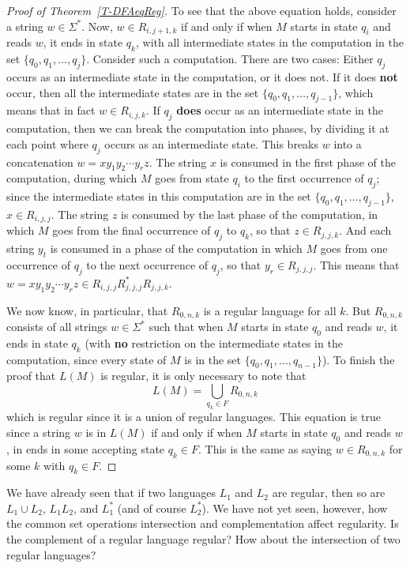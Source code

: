 \begin{proof}[Proof of Theorem~\ref{T-DFAeqReg}]
To see that the above equation holds, consider a string $w\in\Sigma^*$.
Now, $w\in R_{i,j+1,k}$ if and only if when $M$ starts in state $q_i$ and reads $w$,
it ends in state $q_k$, with all intermediate states in the computation in the set
$\{q_0,q_1,\dots,q_j\}$.  Consider such a computation.  There are two
cases: Either $q_j$ occurs as an intermediate state in the computation, or it does not.
If it does \textbf{not} occur, then all the intermediate states are in the set
$\{q_0,q_1,\dots,q_{j-1}\}$, which means that in fact $w\in R_{i,j,k}$.
If $q_j$ \textbf{does} occur as an intermediate state in the computation, then we can break the
computation into phases, by dividing it at each point where $q_j$ occurs
as an intermediate state.  This breaks $w$ into a concatenation $w=xy_1y_2\cdots y_rz$.
The string $x$ is consumed in the first phase of the computation, during which $M$
goes from state $q_i$ to the first occurrence of $q_j$; since the intermediate states
in this computation are in the set $\{q_0,q_1,\dots,q_{j-1}\}$, $x\in R_{i,j,j}$.
The string $z$ is consumed by the last phase of the computation, in which $M$
goes from the final occurrence of $q_j$ to $q_k$, so that $z\in R_{j,j,k}$.
And each string $y_t$ is consumed in a phase of the computation in which $M$ goes
from one occurrence of $q_j$ to the next occurrence of $q_j$, so that $y_r\in R_{j,j,j}$.
This means that $w=xy_1y_2\cdots y_rz\in R_{i,j,j}R_{j,j,j}^*R_{j,j,k}$.

We now know, in particular, that $R_{0,n,k}$ is a regular language for all $k$.
But $R_{0,n,k}$ consists of all strings $w\in\Sigma^*$ such that when $M$ starts
in state $q_0$ and reads $w$, it ends in state $q_k$ (with \textbf{no} restriction
on the intermediate states in the computation, since every state of $M$ is in
the set $\{q_0,q_1,\dots,q_{n-1}\}$).
To finish the proof that $L(M)$ is regular, it is only necessary to note that
$$L(M)=\bigcup_{q_k\in F} R_{0,n,k}$$
which is regular since it is a union of regular languages.
This equation is true since
a string $w$ is in $L(M)$ if and only if when $M$ starts in state $q_0$ and reads $w$,
in ends in some accepting state $q_k\in F$. This is the same as saying
$w\in R_{0,n,k}$ for some $k$ with $q_k\in F$.
\end{proof}


\bigskip

We have already seen that if two languages $L_1$ and $L_2$ are
regular, then so are $L_1 \cup L_2$, $L_1L_2$, and $L_1^*$ 
(and of course $L_2^*$).  We have not yet seen, however, how the 
common
set operations intersection and complementation affect regularity.
Is the complement of a regular language regular?  How about the
intersection of two regular languages?

